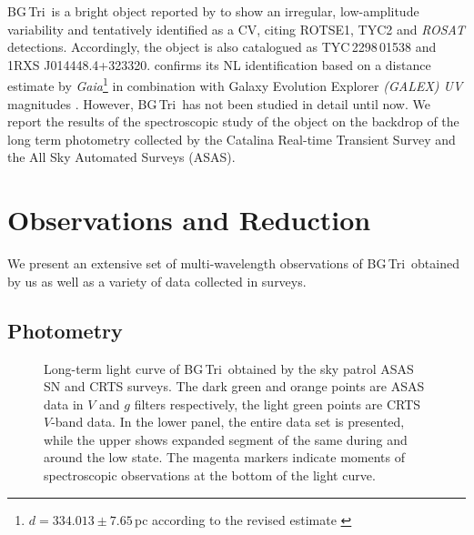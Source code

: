 \documentclass[fleqn,usenatbib]{mnras}
\def\bg{BG\,Tri}
\begin{document}
\bg\ is a bright object reported by \citet{2004AJ....127.2436W,2008PZP.....8....4K} to show an irregular, low-amplitude variability and
tentatively identified as a CV, citing ROTSE1, TYC2 and {\it ROSAT} detections. Accordingly, the object is also catalogued as 
TYC\,2298\,01538 and 1RXS J014448.4+323320. \citet{2017RMxAA..53..439M}  confirms its NL identification based on a distance estimate 
by {\it Gaia}\footnote{ $d= 334.013 \pm 7.65 $\,pc according to the revised estimate \citet{Bailer18}} \citep{2018AA...616A...1G} in combination with Galaxy Evolution Explorer {\it (GALEX) UV} magnitudes \citep{2003SPIE.4854..336M}. However, \bg\ has not been 
studied in detail until now. We report the results of the spectroscopic study of the object on the backdrop of the long term 
photometry collected by the Catalina Real-time Transient Survey and the All Sky Automated Surveys (ASAS). 


\section{Observations and Reduction}
\label{sec:observations}
We  present an extensive set of multi-wavelength observations of \bg\  obtained  by us as well as a variety of data collected in surveys. 

\subsection{Photometry}
 
\begin{figure}
\setlength{\unitlength}{1mm}
\caption{
 Long-term light curve of \bg\ obtained by the sky  patrol ASAS SN and CRTS surveys. The dark green and orange points are ASAS 
 data in $V$ and $g$ filters respectively, the light green  points are CRTS $V$-band data. In the lower panel, the entire data set is
 presented, while the upper shows expanded segment of the same during and around the low state. The magenta markers indicate moments of
 spectroscopic observations at the bottom of the light curve. }
\label{fig:lccurve}
\end{figure}

\begin{figure*}
\setlength{\unitlength}{1mm}
\caption{
 The combined and averaged low-resolution spectrum of \bg\  obtained at different epochs with different instruments. 
 Major lines identified in the spectrum are marked on top, while atmospheric oxygen lines are marked at the bottom.   triplet is
 also marked, although we are not sure if it is real.}
\label{fig:lowres}
\end{figure*} 
\end{document}
